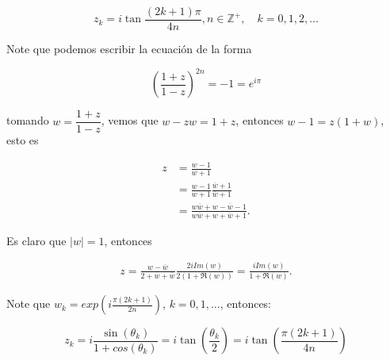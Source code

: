 \documentclass[11pt]{article}
\begin{document}
$$
z_{k}=i \tan \frac{(2 k+1) \pi}{4 n}, n \in \mathbb{Z}^{+}, \quad k=0,1,2, \ldots
$$

Note que podemos escribir la ecuación de la forma

$$\left(\frac{1+z}{1-z}\right)^{2n}=-1=e^{i\pi}$$

tomando $w=\dfrac{1+z}{1-z}$, vemos que $w-zw=1+z$, entonces $w-1=z(1+w)$, esto es

\begin{align*}
   z&=\frac{w-1}{w+1}\\
   &=\frac{w-1}{w+1}\frac{\overline{w}+1}{\overline{w}+1}\\
   &=\frac{w\overline{w}+w-\overline{w}
     -1}{w \overline{w}+w+\overline{w}+1}
 .\end{align*} 

Es claro que $|w|=1$, entonces

\begin{align*}
  z=\frac{w-\overline{w}}{2+w+\overline{w}}\frac{2iIm(w)}{2(1+\Re(w))}=\frac{iIm(w)}{1+\Re(w)}
.\end{align*}

Note que $w_k=exp\left(i \displaystyle\frac{\pi(2k+1)}{2n}\right)$, $k=0,1,\ldots$, entonces:

$$z_k=i\frac{\sin(\theta_k)}{1+cos(\theta_k)}=i\tan\left(\frac{\theta_k}{2}\right)=i\tan\left(\frac{\pi(2k+1)}{4n}\right)$$
\end{document}
